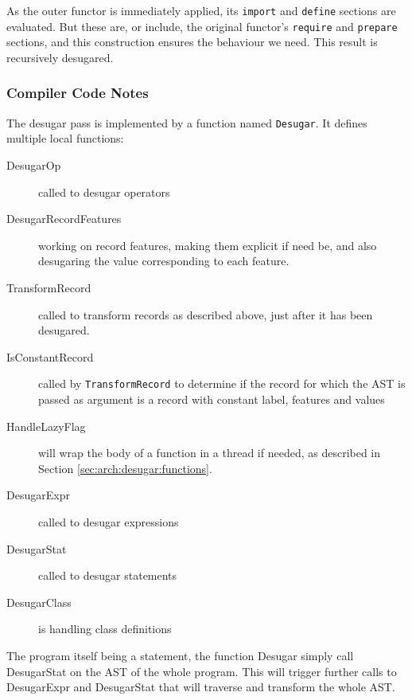 \documentclass[a4paper]{memoir}
\begin{document}
As the outer functor is immediately applied, its \lstinline!import! and \lstinline!define! sections are evaluated.
But these are, or include, the original functor's \lstinline!require! and \lstinline!prepare! sections, and this
construction ensures the behaviour we need.
This result is recursively desugared.

\subsubsection{Compiler Code Notes}
The desugar pass is implemented by a function named \lstinline!Desugar!. It defines multiple local functions:
\begin{description}
  \item[DesugarOp] called to desugar operators
  \item[DesugarRecordFeatures] working on record features, making them explicit if need be, and also desugaring the value corresponding to each feature.
  \item[TransformRecord] called to transform records as described above, just after it has been desugared.
  \item[IsConstantRecord] called by \lstinline!TransformRecord! to determine if the record for which the AST is passed as argument is a record with constant label, features and values
  \item[HandleLazyFlag] will wrap the body of a function in a thread if needed, as described in Section \ref{sec:arch:desugar:functions}.
  \item[DesugarExpr] called to desugar expressions
  \item[DesugarStat] called to desugar statements
  \item[DesugarClass] is handling class definitions 
\end{description}

The program itself being a statement, the function Desugar simply call DesugarStat on the AST of the whole program. This will trigger further calls to DesugarExpr and DesugarStat that will traverse and transform the whole AST.
\end{document}
